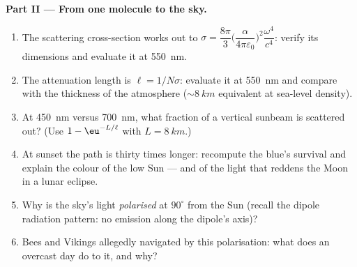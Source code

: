 \begin{problem}
\medskip\noindent\textbf{Part II --- From one molecule to the
sky.}
\begin{enumerate}[resume]
  \item The scattering cross-section works out to $\sigma =
        \dfrac{8\pi}{3}\Big(\dfrac{\alpha}{4\pi\varepsilon_0}
        \Big)^2\dfrac{\omega^4}{c^4}$: verify its dimensions and
        evaluate it at \qty{550}{nm}.
  \item The attenuation length is $\ell = 1/N\sigma$: evaluate it
        at \qty{550}{nm} and compare with the thickness of the
        atmosphere ($\sim\qty{8}{km}$ equivalent at sea-level
        density).
  \item At \qty{450}{nm} versus \qty{700}{nm}, what fraction of a
        vertical sunbeam is scattered out? (Use $1 -
        \eu^{-L/\ell}$ with $L = \qty{8}{km}$.)
  \item At sunset the path is thirty times longer: recompute the
        blue's survival and explain the colour of the low Sun ---
        and of the light that reddens the Moon in a lunar
        eclipse.
  \item Why is the sky's light \emph{polarised} at $90^\circ$
        from the Sun (recall the dipole radiation pattern: no
        emission along the dipole's axis)?
  \item Bees and Vikings allegedly navigated by this
        polarisation: what does an overcast day do to it, and
        why?
\end{enumerate}


\end{problem}
